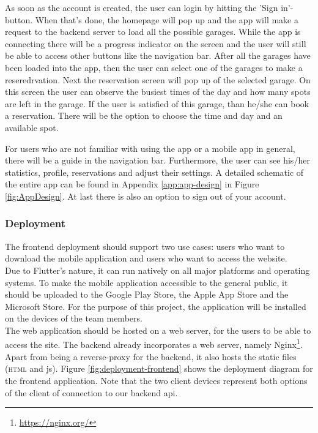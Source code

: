 \ind As soon as the account is created, the user can login by hitting the 'Sign in'-button. When that's done, the homepage will pop up and the app will make a request to the backend server to load all the possible garages. While the app is connecting there will be a progress indicator on the screen and the user will still be able to access other buttons like the navigation bar. After all the garages have been loaded into the app, then the user can select one of the garages to make a reseredrvation. Next the reservation screen will pop up of the selected garage. On this screen the user can observe the busiest times of the day and how many spots are left in the garage. If the user is satisfied of this garage, than he/she can book a reservation. There will be the option to choose the time and day and an available spot.

\ind For users who are not familiar with using the app or a mobile app in general, there will be a guide in the navigation bar. Furthermore, the user can see his/her statistics, profile, reservations and adjust their settings. A detailed schematic of the entire app can be found in Appendix \ref{app:app-design} in Figure \ref{fig:AppDesign}. At last there is also an option to sign out of your account. 

\subsubsection{Deployment}
The frontend deployment should support two use cases: users who want to download the mobile application and users who want to access the website. \\

Due to Flutter's nature, it can run natively on all major platforms and operating systems. To make the mobile application accessible to the general public, it should be uploaded to the Google Play Store, the Apple App Store and the Microsoft Store. For the purpose of this project, the application will be installed on the devices of the team members. \\

The web application should be hosted on a web server, for the users to be able to access the site. The backend already incorporates a web server, namely Nginx\footnote{\url{https://nginx.org/}}. Apart from being a reverse-proxy for the backend, it also hosts the static files (\textsc{html} and \ac{js}). Figure \ref{fig:deployment-frontend} shows the deployment diagram for the frontend application. Note that the two client devices represent both options of the client of connection to our backend \ac{api}.


